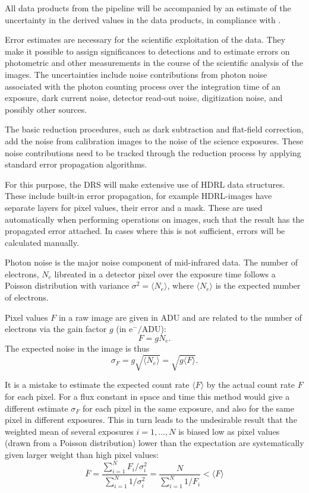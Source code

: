 All data products from the pipeline will be accompanied by an
estimate of the uncertainty in the derived values in the data products, in compliance with .

Error estimates are necessary for the scientific
exploitation of the data. They make it possible to assign
significances to detections and to estimate errors on photometric and
other measurements in the course of the scientific analysis of the
images. The uncertainties include noise contributions from photon
noise associated with the photon counting process over the integration
time of an exposure, dark current noise, detector read-out noise,
digitization noise, and possibly other sources.

The basic reduction procedures, such as dark subtraction and
flat-field correction, add the noise from calibration images to the
noise of the science exposures. These noise contributions need to be
tracked through the reduction process by applying standard error
propagation algorithms.

For this purpose, the DRS will make extensive use of \ac{HDRL} data structures.
These include built-in error propagation, for example HDRL-images have separate
layers for pixel values, their error and a mask. These are used automatically
when performing operations on images, such that the result has the propagated
error attached. In cases where this is not sufficient, errors will be calculated
manually.

Photon noise is the major noise component of mid-infrared data. The
number of electrons, $N_{e}$ libreated in a detector pixel over the
exposure time follows a Poisson distribution with variance $\sigma^{2}
= \langle N_{e}\rangle$, where $\langle N_{e}\rangle$ is the expected
number of electrons.

Pixel values $F$ in a raw image are given in ADU and are related to
the number of electrons via the gain factor $g$ (in
$\mathrm{e}^{-}/\mathrm{ADU}$):
\begin{equation}
  \label{eq:gain_def}
  F = g N_{e}.
\end{equation}
The expected noise in the image is thus
\begin{equation}
  \label{eq:noise_adu}
  \sigma_{F} = g\sqrt{\langle N_{e}\rangle} = \sqrt{g \langle F\rangle}.
\end{equation}

It is a mistake to estimate the expected count rate $\langle F\rangle$
by the actual count rate $F$ for each pixel. For a flux constant in
space and time this method would give a different estimate
$\sigma_{F}$ for each pixel in the same exposure, and also for the same pixel
in different exposures. This in turn leads to the undesirable result
that the weighted mean of several exposures $i = 1,\dots, N$ is biased
low as pixel values (drawn from a Poisson distribution) lower than the
expectation are systematically given larger weight than high pixel
values:
\begin{equation}
  \label{eq:weighted_mean}
  \overline{F} = \frac{\sum_{i=1}^{N}
    F_{i}/\sigma_{i}^{2}}{\sum_{i=1}^{N} 1/\sigma_{i}^{2}} =
  \frac{N}{\sum_{i=1}^{N}1/F_{i}} < \langle F\rangle
\end{equation}

